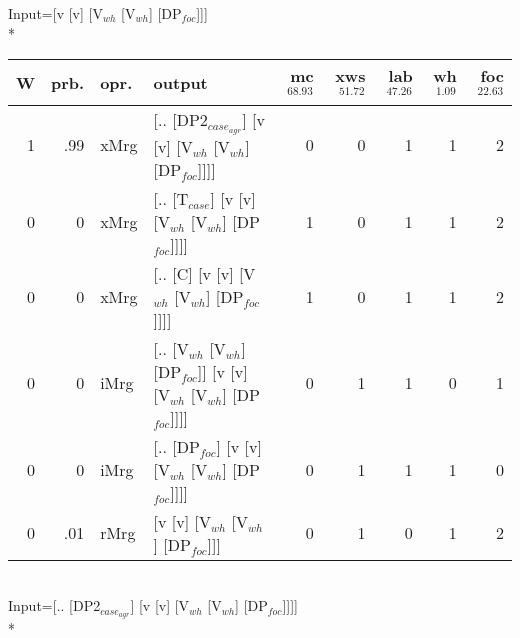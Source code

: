 \begingroup\scriptsize Input=[v [v] [V$_{wh}$ [V$_{wh}$] [DP$_{foc}$]]]\\*
\begin{tabularx}{\linewidth}{rrlXrrrrr}
\hline
   W &   prb. & opr.   & output                                                     &   mc$^{68.93}$ &   xws$^{51.72}$ &   lab$^{47.26}$ &   wh$^{1.09}$ &   foc$^{22.63}$ \\
\hline
   1 &   .99 & xMrg & [.. [DP2$_{case_{agr}}$] [v [v] [V$_{wh}$ [V$_{wh}$] [DP$_{foc}$]]]]         &            0 &             0 &             1 &            1 &             2 \\
   0 &   0 & xMrg & [.. [T$_{case}$] [v [v] [V$_{wh}$ [V$_{wh}$] [DP$_{foc}$]]]]               &            1 &             0 &             1 &            1 &             2 \\
   0 &   0 & xMrg & [.. [C] [v [v] [V$_{wh}$ [V$_{wh}$] [DP$_{foc}$]]]]                    &            1 &             0 &             1 &            1 &             2 \\
   0 &   0 & iMrg & [.. [V$_{wh}$ [V$_{wh}$] [DP$_{foc}$]] [v [v] [V$_{wh}$ [V$_{wh}$] [DP$_{foc}$]]]] &            0 &             1 &             1 &            0 &             1 \\
   0 &   0 & iMrg & [.. [DP$_{foc}$] [v [v] [V$_{wh}$ [V$_{wh}$] [DP$_{foc}$]]]]               &            0 &             1 &             1 &            1 &             0 \\
   0 &   .01 & rMrg & [v [v] [V$_{wh}$ [V$_{wh}$] [DP$_{foc}$]]]                             &            0 &             1 &             0 &            1 &             2 \\
\hline
\end{tabularx}\endgroup\\
\begingroup\scriptsize Input=[.. [DP2$_{case_{agr}}$] [v [v] [V$_{wh}$ [V$_{wh}$] [DP$_{foc}$]]]]\\*
